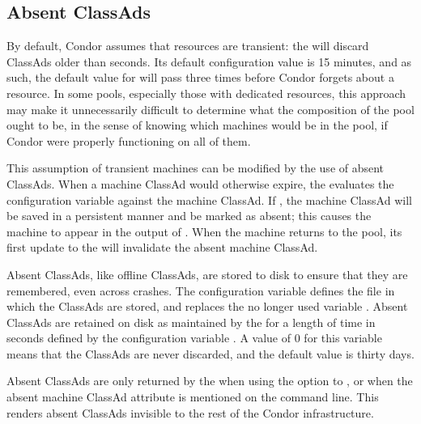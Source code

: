 \subsection{\label{sec:Absent-Ads}Absent ClassAds}

By default, Condor assumes that resources are transient: 
the 
will discard ClassAds older than  seconds.
Its default configuration value is 15 minutes, 
and as such, the default value for  will 
pass three times before Condor forgets about a resource.
In some pools, especially those with dedicated resources, 
this approach may make it unnecessarily difficult to determine 
what the composition of the pool ought to be, 
in the sense of knowing which machines would be in the pool,
if Condor were properly functioning on all of them.

This assumption of transient machines can be modified by 
the use of absent ClassAds.  
When a machine ClassAd would otherwise expire, 
the  evaluates the configuration variable
 against the machine ClassAd.
If , 
the machine ClassAd will be saved in a persistent manner and 
be marked as absent;
this causes the machine to appear in the output of 
.
When the machine returns to the pool, 
its first update to the  will 
invalidate the absent machine ClassAd.

Absent ClassAds, like offline ClassAds, 
are stored to disk to ensure that they are remembered,
even across  crashes.
The configuration variable 
defines the file in which the ClassAds are stored,
and replaces the no longer used variable .
Absent ClassAds are retained on disk as maintained by 
the  for a length of time in seconds defined by the
configuration variable .
A value of 0 for this variable means that the ClassAds are never discarded,
and the default value is thirty days.

Absent ClassAds are only returned by the  when 
using the  option to ,
or when the absent machine ClassAd attribute is mentioned on 
the  command line.  
This renders absent ClassAds invisible to the rest of the Condor infrastructure.
